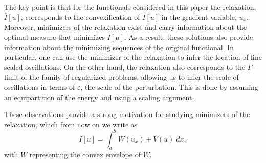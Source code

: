 \documentclass[11pt]{article}
\newcommand{\eps}{\varepsilon}
\theoremstyle{plain}
\begin{document}
 
 \vspace{4ex}
\begin{center}
\end{center}
  The key point is that for the functionals considered in this paper the relaxation, $\overline{I}[u]$, corresponds to the convexification of $I[u]$ in the gradient variable, $u_x$. Moreover, minimizers of the relaxation  exist and carry information about  the optimal measure that minimizes $\tilde{I}[\mu]$. As a result, these solutions also provide information about the minimizing sequences of the original functional. In particular, one can use the minimizer of the relaxation to infer the location of fine scaled oscillations. On the other hand, the relaxation also corresponds to the $\Gamma$-limit of the family of regularized problems, allowing us to infer the scale of oscillations in terms of $\eps$, the scale of the perturbation. This is done by assuming an equipartition of the energy and using a scaling argument.
  

These observations provide a strong motivation for studying minimizers of the relaxation, which from now on we write as
  \[ \overline{I}[u] = \int_a^b \overline{W}(u_x) + V(u) \;dx, \]
with $\overline{W}$ representing the convex envelope of $W$.
\end{document}

